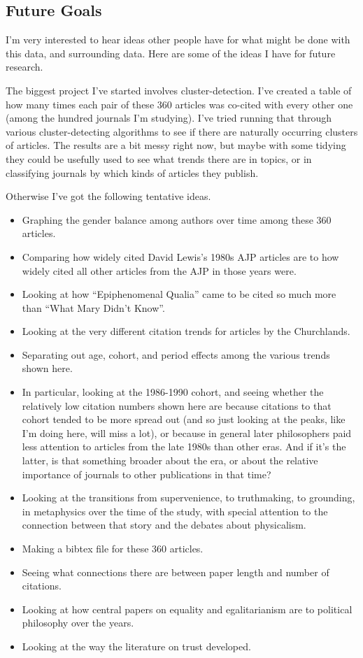 \documentclass[
  10pt,
  letterpaper,
  DIV=11,
  numbers=noendperiod,
  twoside]{scrartcl}
\providecommand{\tightlist}{%
  \setlength{\itemsep}{0pt}\setlength{\parskip}{0pt}}\usepackage{longtable,booktabs,array}
\begin{document}
\subsection{Future Goals}\label{sec-future-goals}

I'm very interested to hear ideas other people have for what might be
done with this data, and surrounding data. Here are some of the ideas I
have for future research.

The biggest project I've started involves cluster-detection. I've
created a table of how many times each pair of these 360 articles was
co-cited with every other one (among the hundred journals I'm studying).
I've tried running that through various cluster-detecting algorithms to
see if there are naturally occurring clusters of articles. The results
are a bit messy right now, but maybe with some tidying they could be
usefully used to see what trends there are in topics, or in classifying
journals by which kinds of articles they publish.

Otherwise I've got the following tentative ideas.

\begin{itemize}
\tightlist
\item
  Graphing the gender balance among authors over time among these 360
  articles.
\item
  Comparing how widely cited David Lewis's 1980s AJP articles are to how
  widely cited all other articles from the AJP in those years were.
\item
  Looking at how ``Epiphenomenal Qualia'' came to be cited so much more
  than ``What Mary Didn't Know''.
\item
  Looking at the very different citation trends for articles by the
  Churchlands.
\item
  Separating out age, cohort, and period effects among the various
  trends shown here.
\item
  In particular, looking at the 1986-1990 cohort, and seeing whether the
  relatively low citation numbers shown here are because citations to
  that cohort tended to be more spread out (and so just looking at the
  peaks, like I'm doing here, will miss a lot), or because in general
  later philosophers paid less attention to articles from the late 1980s
  than other eras. And if it's the latter, is that something broader
  about the era, or about the relative importance of journals to other
  publications in that time?
\item
  Looking at the transitions from supervenience, to truthmaking, to
  grounding, in metaphysics over the time of the study, with special
  attention to the connection between that story and the debates about
  physicalism.
\item
  Making a bibtex file for these 360 articles.
\item
  Seeing what connections there are between paper length and number of
  citations.
\item
  Looking at how central papers on equality and egalitarianism are to
  political philosophy over the years.
\item
  Looking at the way the literature on trust developed.
\end{itemize}
\end{document}

